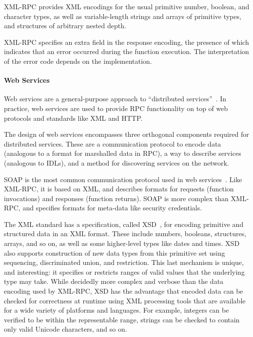 XML-RPC provides XML encodings for the usual primitive number, boolean, and character types, as well as variable-length strings and arrays of primitive types, and structures of arbitrary nested depth.

XML-RPC specifies an extra field in the response encoding, the presence of which indicates that an error occurred during the function execution. The interpretation of the error code depends on the implementation.

\paragraph{Web Services}

Web services are a general-purpose approach to ``distributed services''~\cite{spec00soap11,curbera02soap}. In practice, web services are used to provide RPC functionality on top of web protocols and standards like XML and HTTP.

The design of web services encompasses three orthogonal components required for distributed services. These are a communication protocol to encode data (analogous to a format for marshalled data in RPC), a way to describe services (analogous to IDLs), and a method for discovering services on the network.

SOAP is the most common communication protocol used in web services~\cite{spec00soap11, curbera02soap}. Like XML-RPC, it is based on XML, and describes formats for requests (function invocations) and responses (function returns). SOAP is more complex than XML-RPC, and specifies formats for meta-data like security credentials.

The XML standard has a specification, called XSD~\cite{biron04xsd}, for encoding primitive and structured data in an XML format. These include numbers, booleans, structures, arrays, and so on, as well as some higher-level types like dates and times. XSD also supports construction of new data types from this primitive set using sequencing, discriminated union, and restriction. This last mechanism is unique, and interesting: it specifies or restricts ranges of valid values that the underlying type may take. While decidedly more complex and verbose than the data encoding used by XML-RPC, XSD has the advantage that encoded data can be checked for correctness at runtime using XML processing tools that are available for a wide variety of platforms and languages. For example, integers can be verified to be within the representable range, strings can be checked to contain only valid Unicode characters, and so on.

